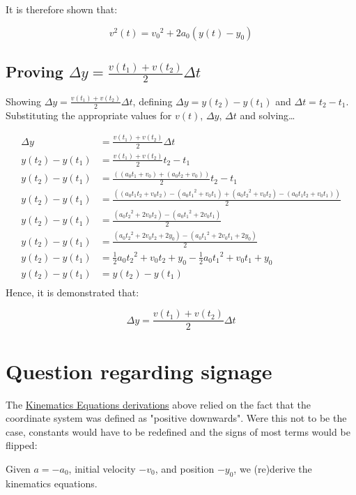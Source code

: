 \documentclass[letterpaper]{article}
\begin{document}
It is therefore shown that:

\begin{equation}
    v^2(t) = {v_0}^2 + 2a_0 (y(t) - y_0) 
\end{equation}

\subsection{Proving \(\Delta y = \frac{v(t_1)+v(t_2)}{2}\Delta t\)}
\label{sec:org0962baa}
Showing \(\Delta y = \frac{v(t_1)+v(t_2)}{2}\Delta t\), defining \(\Delta y=y(t_2)-y(t_1)\) and \(\Delta t = t_2 - t_1\). Substituting the appropriate values for \(v(t)\), \(\Delta y\), \(\Delta t\) and solving\ldots{}

\begin{align}
    \Delta y &= \frac{v(t_1)+v(t_2)}{2}\Delta t \\
    y(t_2)-y(t_1) &= \frac{v(t_1)+v(t_2)}{2} t_2 - t_1 \\
    y(t_2)-y(t_1) &= \frac{((a_0t_1+v_0)+(a_0t_2+v_0))}{2} t_2 - t_1 \\
    y(t_2)-y(t_1) &= \frac{((a_0t_1t_2+v_0t_2)-(a_0{t_1}^2+v_0t_1)+(a_0{t_2}^2+v_0t_2)-(a_0t_1t_2+v_0t_1))}{2} \\
    y(t_2)-y(t_1) &= \frac{(a_0{t_2}^2+2v_0t_2)-(a_0{t_1}^2+2v_0t_1)}{2} \\
    y(t_2)-y(t_1) &= \frac{(a_0{t_2}^2+2v_0t_2+2y_0)-(a_0{t_1}^2+2v_0t_1+2y_0)}{2} \\
    y(t_2)-y(t_1) &= \frac{1}{2} a_0{t_2}^2+v_0t_2+y_0 - \frac{1}{2} a_0{t_1}^2+v_0t_1+y_0 \\
    y(t_2)-y(t_1) &= y(t_2) - y(t_1) \\
\end{align}
Hence, it is demonstrated that: 

\begin{equation}
    \Delta y = \frac{v(t_1)+v(t_2)}{2}\Delta t
\end{equation}

\section{Question regarding signage}
\label{sec:org2da23b3}
The \hyperref[sec:org1e44f1a]{Kinematics Equations derivations} above relied on the fact that the coordinate system was defined as "positive downwards". Were this not to be the case, constants would have to be redefined and the signs of most terms would be flipped:

Given \(a=-a_0\), initial velocity \(-v_0\), and position \(-y_0\), we (re)derive the kinematics equations.
\end{document}
